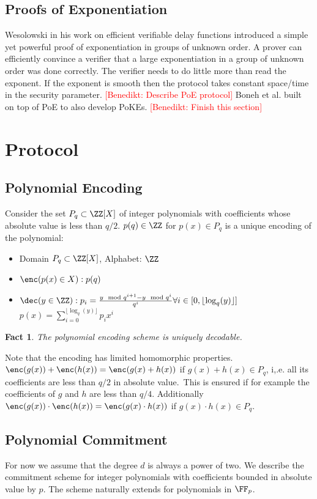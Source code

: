 \documentclass{article}
\newtheorem{fact}{Fact}
\newcommand{\benedikt}[1]{{\textcolor{red}{[Benedikt: #1]}}}
\newcommand{\benedikt}[1]{}
\begin{document}
\subsection{Proofs of Exponentiation}
Wesolowski \cite{EC:Wesolowski19} in his work on efficient verifiable delay functions introduced a simple yet powerful proof of exponentiation in groups of unknown order. A prover can efficiently convince a verifier that a large exponentiation in a group of unknown order was done correctly. The verifier needs to do little more than read the exponent. If the exponent is smooth then the protocol takes constant space/time in the security parameter.
\benedikt{Describe PoE protocol}
Boneh et al. \cite{journals/iacr/BonehBF18a} built on top of PoE to also develop PoKEs. \benedikt{Finish this section}
\section{Protocol}
\label{sec:protocol}

\subsection{Polynomial Encoding}

	Consider the set $P_q\subset \ZZ[X]$ of integer polynomials with coefficients whose absolute value is less than $q/2$. $p(q) \in \ZZ$ for $p(x)\in P_q$ is a unique encoding of the polynomial:
\begin{itemize}
	\item Domain $P_q \subset \ZZ[X]$, Alphabet: $\ZZ$
	\item $\enc(p(x) \in X): p(q)$
	\item $\dec(y \in \ZZ): p_i=\frac{y \mod q^{i+1}-y \mod q^{i}}{q^i} \forall i \in [0,\lfloor\log_q(y)\rfloor]$\\
	$p(x)=\sum_{i=0}^{\lfloor\log_q(y)\rfloor} p_i x^i$
\end{itemize}

\begin{fact}
	The polynomial encoding scheme is uniquely decodable.
\end{fact}

Note that the encoding has limited homomorphic properties. $\enc(g(x))+\enc(h(x))=\enc(g(x)+h(x))$ if $g(x)+h(x)\in P_q$, i,.e. all its coefficients are less than $q/2$ in absolute value.\ This is ensured if for example the coefficients of $g$ and $h$ are less than $q/4$. Additionally $\enc(g(x))\cdot \enc(h(x))=\enc(g(x)\cdot h(x))$ if $g(x)\cdot h(x)\in P_q$.
\subsection{Polynomial Commitment}
 For now we assume that the degree $d$ is always a power of two. We describe the commitment scheme for integer polynomials with coefficients bounded in absolute value by $p$. The scheme naturally extends for polynomials in $\FF_p$.
\end{document}
